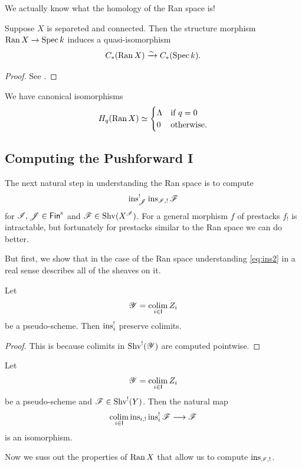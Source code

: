 \documentclass[oneside]{amsart}
\newcommand{\CI}{\mathcal{I}}
\newcommand{\CY}{\mathcal{Y}}
\newcommand{\CJ}{\mathcal{J}}
\begin{document}
We actually know what the homology of the Ran space is!
\begin{theorem}
	Suppose $X$ is separeted and connected. Then the structure morphism $\Ran X\to \Spec k$ induces a quasi-isomorphism
	\[
	C_*(\operatorname{Ran} X) \xrightarrow{\sim} C_*(\operatorname{Spec} k).
	\] 
\end{theorem}
\begin{proof}
	See \cite[Theorem~2.4.5]{weil}.
\end{proof}
\begin{corollary}
	We have canonical isomorphisms
	\[
	H_q(\operatorname{Ran} X) \simeq \begin{cases}
		\Lambda & \text{if }q=0 \\
		0 & \text{otherwise}.
	\end{cases}
	\] 
\end{corollary}

\subsection{Computing the Pushforward I}
The next natural step in understanding the Ran space is to compute
\begin{equation}\label{eq:ins2}
\ins_\CJ^{!}\ins_{\CI,!} \CF
\end{equation} 
for $\CI,\CJ\in \Fins$ and $\CF\in \Shv(X^{\CI})$. For a general morphism $f$ of prestacks $f_!$ is intractable, but fortunately for prestacks similar to the Ran space we can do better.

But first, we show that in the case of the Ran space understanding \eqref{eq:ins2} in a real sense describes all of the sheaves on it.

\begin{lemma}
	Let
	\[
		\CY = \colim_{i\in \cat{I}}Z_i
	\] 
	be a pseudo-scheme. Then $\operatorname{ins}_i^{!}$ preserve colimits.
\end{lemma}
\begin{proof}
	This is because colimits in $\Shv^{!}(\CY)$ are computed pointwise.
\end{proof}
\begin{corollary}
	Let
	\[
		\CY = \colim_{i\in \cat{I}}Z_i
	\] 
	be a pseudo-scheme and $\mathscr{F}\in \operatorname{Shv}^{!}(Y)$. Then the natural map
	\[
		\colim_{i\in \cat{I}} \ins_{i,!}\ins_i^{!}\CF \to \CF
	\] 
	is an isomorphism.
\end{corollary}

Now we suss out the properties of $\operatorname{Ran} X$ that allow us to compute $\ins_{\CI,!}$.
\end{document}
